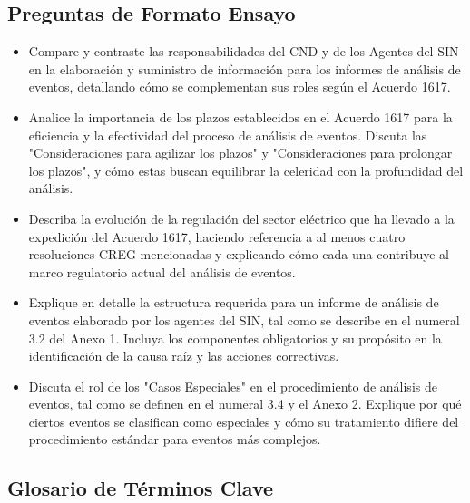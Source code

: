 \documentclass[a5paper]{book}%
\begin{document}
\subsection{Preguntas de Formato Ensayo}
\begin{itemize}
\item Compare y contraste las responsabilidades del CND y de los Agentes del SIN en la elaboración y suministro de información para los informes de análisis de eventos, detallando cómo se complementan sus roles según el Acuerdo 1617.
   
\item  Analice la importancia de los plazos establecidos en el Acuerdo 1617 para la eficiencia y la efectividad del proceso de análisis de eventos. Discuta las "Consideraciones para agilizar los plazos" y "Consideraciones para prolongar los plazos", y cómo estas buscan equilibrar la celeridad con la profundidad del análisis.
    
\item Describa la evolución de la regulación del sector eléctrico que ha llevado a la expedición del Acuerdo 1617, haciendo referencia a al menos cuatro resoluciones CREG mencionadas y explicando cómo cada una contribuye al marco regulatorio actual del análisis de eventos.
\item Explique en detalle la estructura requerida para un informe de análisis de eventos elaborado por los agentes del SIN, tal como se describe en el numeral 3.2 del Anexo 1. Incluya los componentes obligatorios y su propósito en la identificación de la causa raíz y las acciones correctivas.
\item Discuta el rol de los "Casos Especiales" en el procedimiento de análisis de eventos, tal como se definen en el numeral 3.4 y el Anexo 2. Explique por qué ciertos eventos se clasifican como especiales y cómo su tratamiento difiere del procedimiento estándar para eventos más complejos.
\end{itemize}
\subsection{Glosario de Términos Clave}
\end{document}

